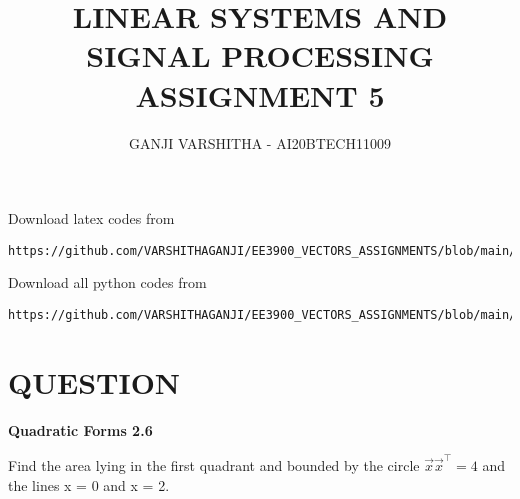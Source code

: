 \documentclass[journal,12pt,twocolumn]{IEEEtran}
\begin{document}
\let\vec\mathbf
\renewcommand{\thefigure}{\theproblem}
\def\putbox#1#2#3{\makebox[0in][l]{\makebox[#1][l]{}\raisebox{\baselineskip}[0in][0in]{\raisebox{#2}[0in][0in]{#3}}}}
     \def\rightbox#1{\makebox[0in][r]{#1}}
     \def\centbox#1{\makebox[0in]{#1}}
     \def\topbox#1{\raisebox{-\baselineskip}[0in][0in]{#1}}
     \def\midbox#1{\raisebox{-0.5\baselineskip}[0in][0in]{#1}}
\vspace{3cm}
\title{\textbf{LINEAR SYSTEMS AND SIGNAL PROCESSING \\ ASSIGNMENT 5}}
\author{GANJI VARSHITHA - AI20BTECH11009}
\maketitle
\newpage
\bigskip
\renewcommand{\thefigure}{\arabic{figure}}
\renewcommand{\thetable}{\arabic{table}}
Download latex codes from 
%
\begin{lstlisting}
https://github.com/VARSHITHAGANJI/EE3900_VECTORS_ASSIGNMENTS/blob/main/QUADRATIC_FORMS_ASSIGNMENT5/QUADRATIC_FORMS_ASSIGNMENT5.tex
\end{lstlisting}



Download all python codes from
\begin{lstlisting}
https://github.com/VARSHITHAGANJI/EE3900_VECTORS_ASSIGNMENTS/blob/main/QUADRATIC_FORMS_ASSIGNMENT5/plot_code.py
\end{lstlisting}




\section*{QUESTION}
\textbf{Quadratic Forms 2.6}


Find the area lying in the first quadrant and bounded by the circle $ \Vec{x}\Vec{x}^\top = 4 $ and the lines x = 0 and x = 2.
 
\end{document}
